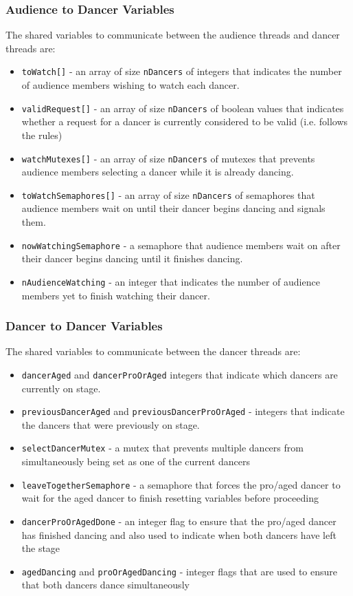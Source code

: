 \documentclass[12pt,a4paper]{scrartcl}
\begin{document}
\subsubsection{Audience to Dancer Variables}
The shared variables to communicate between the audience threads and dancer threads are:
\begin{itemize}
    \item \texttt{toWatch[]} -
          an array of size \texttt{nDancers} of integers that indicates the number of audience members wishing to watch each dancer.
    \item \texttt{validRequest[]} -
          an array of size \texttt{nDancers} of boolean values that indicates whether a request for a dancer is currently considered to be valid (i.e. follows the rules)
    \item \texttt{watchMutexes[]} -
          an array of size \texttt{nDancers} of mutexes that prevents audience members selecting a dancer while it is already dancing.
    \item \texttt{toWatchSemaphores[]} -
          an array of size \texttt{nDancers} of semaphores that audience members wait on until their dancer begins dancing and signals them.
    \item \texttt{nowWatchingSemaphore} -
          a semaphore that audience members wait on after their dancer begins dancing until it finishes dancing.
    \item \texttt{nAudienceWatching} -
          an integer that indicates the number of audience members yet to finish watching their dancer.
\end{itemize}

\subsubsection{Dancer to Dancer Variables}
The shared variables to communicate between the dancer threads are:
\begin{itemize}
    \item \texttt{dancerAged} and \texttt{dancerProOrAged}
          integers that indicate which dancers are currently on stage.
    \item \texttt{previousDancerAged} and \texttt{previousDancerProOrAged} - 
          integers that indicate the dancers that were previously on stage.
    \item \texttt{selectDancerMutex} -
          a mutex that prevents multiple dancers from simultaneously being set as one of the current dancers
    \item \texttt{leaveTogetherSemaphore} -
          a semaphore that forces the pro/aged dancer to wait for the aged dancer to finish resetting variables before proceeding
    \item \texttt{dancerProOrAgedDone} -
          an integer flag to ensure that the pro/aged dancer has finished dancing and also used to indicate when both dancers have left the stage
    \item \texttt{agedDancing} and \texttt{proOrAgedDancing} - 
          integer flags that are used to ensure that both dancers dance simultaneously
\end{itemize}
\end{document}
